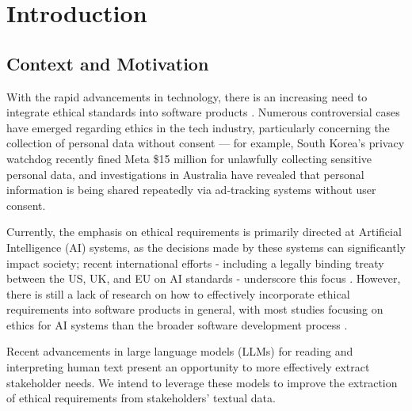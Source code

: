 
%

\chapter{Introduction}
\label{cha:introduction}


\epigraphfontsize{\small\itshape}
\setlength\epigraphwidth{12.5cm}
\setlength\epigraphrule{0pt}


\section{Context and Motivation}
With the rapid advancements in technology, there is an increasing need to integrate ethical standards into software products \cite{gogoll2021ethics}. Numerous controversial cases have emerged 
regarding ethics in the tech industry, particularly concerning the collection of personal data without consent — for example, South Korea’s privacy watchdog recently fined Meta \$15 million for 
unlawfully collecting sensitive personal data\cite{ReutersMeta2024}, and investigations in Australia have revealed that personal information is being shared repeatedly via ad‐tracking systems without user consent\cite{AussiesData2024}. 

Currently, the emphasis on ethical requirements is primarily directed at Artificial Intelligence (AI) systems, as the decisions made by these systems can significantly impact society; recent international efforts - including
a legally binding treaty between the US, UK, and EU on AI standards - underscore this focus \cite{TETAIStandards2024}. However, there is still a lack of research on how to effectively incorporate 
ethical requirements into software products in general, with most studies focusing on ethics for AI systems than the broader software development process \cite{zuber2022empowered}.

Recent advancements in large language models (LLMs) for reading and interpreting human text \cite{lu2023emergent} present an opportunity to more effectively extract stakeholder needs. 
We intend to leverage these models to improve the extraction of ethical requirements from stakeholders' textual data.

